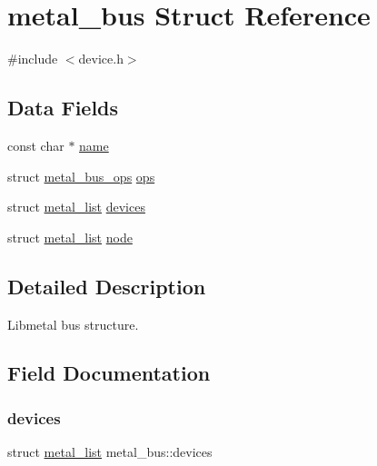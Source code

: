 \hypertarget{structmetal__bus}{}\section{metal\+\_\+bus Struct Reference}
\label{structmetal__bus}


{\ttfamily \#include $<$device.\+h$>$}

\subsection*{Data Fields}
\begin{DoxyCompactItemize}
\item 
const char $\ast$ \hyperlink{structmetal__bus_a38fdc374275d87bb04dab29f9ad53e0b}{name}
\item 
struct \hyperlink{structmetal__bus__ops}{metal\+\_\+bus\+\_\+ops} \hyperlink{structmetal__bus_ad42ebfcf7b0971f28fad6992a8e4c8fd}{ops}
\item 
struct \hyperlink{structmetal__list}{metal\+\_\+list} \hyperlink{structmetal__bus_afe209a0e47a24bf8ce4b271da4336500}{devices}
\item 
struct \hyperlink{structmetal__list}{metal\+\_\+list} \hyperlink{structmetal__bus_a1af389eaabcb3daa33e7794acfbe446b}{node}
\end{DoxyCompactItemize}


\subsection{Detailed Description}
Libmetal bus structure. 

\subsection{Field Documentation}
\mbox{\label{structmetal__bus_afe209a0e47a24bf8ce4b271da4336500}} 
\subsubsection{\texorpdfstring{devices}{devices}}
{\footnotesize\ttfamily struct \hyperlink{structmetal__list}{metal\+\_\+list} metal\+\_\+bus\+::devices}

\mbox{\label{structmetal__bus_a38fdc374275d87bb04dab29f9ad53e0b}} 
